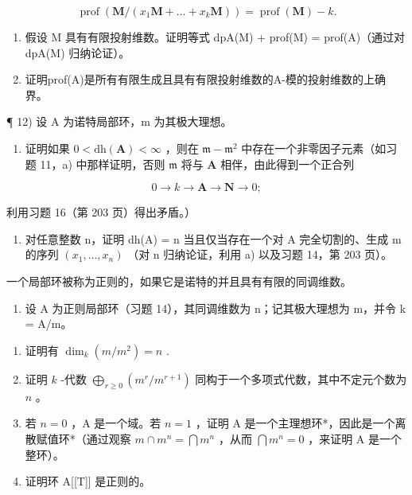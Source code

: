 \[
\operatorname{prof} \left(\mathbf {M} / (x _ {1} \mathbf {M} + \dots + x _ {k} \mathbf {M})\right) = \operatorname{prof} (\mathbf {M}) - k.
\]

\begin{enumerate}
\def\labelenumi{\alph{enumi})}
\setcounter{enumi}{3}
\item
  假设 M 具有有限投射维数。证明等式 dpA(M) + prof(M) = prof(A)（通过对 dpA(M) 归纳论证）。
\item
  证明prof(A)是所有有限生成且具有有限投射维数的A-模的投射维数的上确界。
\end{enumerate}

¶ 12) 设 A 为诺特局部环，m 为其极大理想。

\begin{enumerate}
\def\labelenumi{\alph{enumi})}
\tightlist
\item
  证明如果 \(0 < \mathrm{dh}(\mathbf{A}) < \infty\) ，则在 \(\mathfrak{m} - \mathfrak{m}^2\) 中存在一个非零因子元素（如习题 11，a) 中那样证明，否则 \(\mathfrak{m}\) 将与 \(\mathbf{A}\) 相伴，由此得到一个正合列
\end{enumerate}

\[
0 \to k \to \mathbf {A} \to \mathbf {N} \to 0;
\]

利用习题 16（第 203 页）得出矛盾。）

\begin{enumerate}
\def\labelenumi{\alph{enumi})}
\setcounter{enumi}{1}
\tightlist
\item
  对任意整数 n，证明 dh(A) = n 当且仅当存在一个对 A 完全切割的、生成 m 的序列 \((x_{1}, \ldots, x_{n})\) （对 n 归纳论证，利用 a) 以及习题 14，第 203 页）。
\end{enumerate}

一个局部环被称为正则的，如果它是诺特的并且具有有限的同调维数。

\begin{enumerate}
\def\labelenumi{\arabic{enumi})}
\setcounter{enumi}{12}
\tightlist
\item
  设 A 为正则局部环（习题 14），其同调维数为 n；记其极大理想为 m，并令 k = A/m。
\end{enumerate}

\begin{enumerate}
\def\labelenumi{\alph{enumi})}
\item
  证明有 \(\dim_k(m/m^2) = n\) .
\item
  证明 \(k\) -代数 \(\bigoplus_{r\geqslant 0}(m^{r} / m^{r + 1})\) 同构于一个多项式代数，其中不定元个数为 \(n\) 。
\item
  若 \(n = 0\) ，A 是一个域。若 \(n = 1\) ，证明 A 是一个主理想环*，因此是一个离散赋值环*（通过观察 \(m \cap m^n = \bigcap m^n\) ，从而 \(\bigcap m^n = 0\) ，来证明 A 是一个整环）。
\item
  证明环 A{[}{[}T{]}{]} 是正则的。
\end{enumerate}

